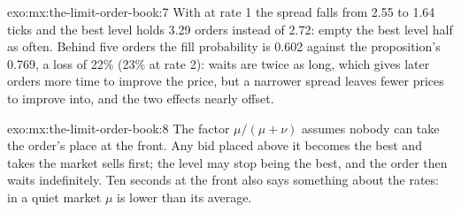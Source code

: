 \begin{solution}{exo:mx:the-limit-order-book:7}
With  at rate 1 the spread falls from 2.55 to 1.64 ticks and the best level holds 3.29 orders instead of 2.72:  empty the
best level half as often. Behind five orders the fill probability is 0.602 against the proposition's 0.769, a loss of 22\% (23\% at rate 2): waits
are twice as long, which gives later orders more time to improve the price, but a narrower spread leaves fewer prices to improve into, and the two
effects nearly offset.
\end{solution}

\begin{solution}{exo:mx:the-limit-order-book:8}
The factor $\mu/(\mu+\nu)$ assumes nobody can take the order's place at the front. Any bid placed above it becomes the best and takes the market
sells first; the level may stop being the best, and the order then waits indefinitely. Ten seconds at the front also says something about the
rates: in a quiet market $\mu$ is lower than its average.
\end{solution}


